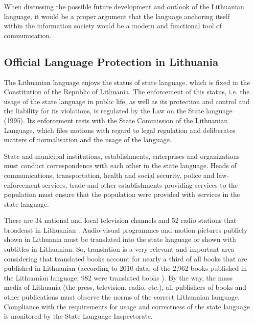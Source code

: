 \begin{multicols}{2}
When discussing the possible future development and outlook of the Lithuanian language, it would be a proper argument that the language anchoring itself within the information society would be a modern and functional tool of communication.

\subsection{Official Language Protection in Lithuania}

The Lithuanian language enjoys the status of state language, which is fixed in the Constitution of the Republic of Lithuania. The enforcement of this status, i.e. the usage of the state language in public life, as well as its protection and control and the liability for its violations, is regulated by the Law on the State language (1995). Its enforcement rests with the State Commission of the Lithuanian Language, which files motions with regard to legal regulation and deliberates matters of normalisation and the usage of the language. 

    State and municipal institutions, establishments, enterprises and organizations must conduct correspondence with each other in the state language. Heads of communications, transportation, health and social security, police and law-enforcement services, trade and other establishments providing services to the population must ensure that the population were provided with services in the state language. 


There are 34 national and local television channels and 52 radio stations that broadcast in Lithuanian \cite{ldrt}. Audio-visual programmes and motion pictures publicly shown in Lithuania must be translated into the state language or shown with subtitles in Lithuanian. So, translation is a very relevant and important area considering that translated books account for nearly a third of all books that are published in Lithuanian (according to 2010 data, of the 2,962 books published in the Lithuanian language, 982 were translated books \cite{bbsc}).  By the way, the mass media of Lithuania (the press, television, radio, etc.), all publishers of books and other publications must observe the norms of the correct Lithuanian language. Compliance with the requirements for usage and correctness of the state language is monitored by the State Language Inspectorate.


\end{multicols}
